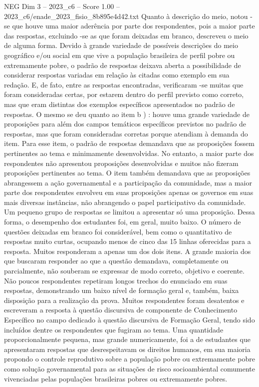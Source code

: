 \begin{textsample}{NEG Dim 3 – 2023\_c6 – Score 1.00 – 2023\_c6/enade\_2023\_fisio\_8b895e4d42.txt}
Quanto à descrição do meio, notou -se que houve uma maior aderência por parte dos respondentes, pois a maior parte das respostas, excluindo -se as que foram deixadas em branco, descreveu o meio de alguma forma.
Devido à grande variedade de possíveis descrições do meio geográfico e/ou social em que vive a população brasileira de perfil pobre ou extremamente pobre, o padrão de respostas deixava aberta a possibilidade de considerar respostas variadas em relação às citadas como exemplo em sua redação.
E, de fato, entre as respostas encontradas, verificaram -se muitas que foram consideradas certas, por estarem dentro do perfil previsto como correto, mas que eram distintas dos exemplos específicos apresentados no padrão de respostas.
O mesmo se deu quanto ao item b ) : houve uma grande variedade de proposições para além dos campos temáticos específicos previstos no padrão de respostas, mas que foram consideradas corretas porque atendiam à demanda do item.
Para esse item, o padrão de respostas demandava que as proposições fossem pertinentes ao tema e minimamente desenvolvidas.
No entanto, a maior parte dos respondentes não apresentou proposições desenvolvidas e muitos não fizeram proposições pertinentes ao tema.
O item também demandava que as proposições abrangessem a ação governamental e a participação da comunidade, mas a maior parte dos respondentes envolveu em suas proposições apenas os governos em suas mais diversas instâncias, não abrangendo o papel participativo da comunidade.
Um pequeno grupo de respostas se limitou a apresentar só uma proposição.
Dessa forma, o desempenho dos estudantes foi, em geral, muito baixo.
O número de questões deixadas em branco foi considerável, bem como o quantitativo de respostas muito curtas, ocupando menos de cinco das 15 linhas oferecidas para a resposta.
Muitos responderam a apenas um dos dois itens.
A grande maioria dos que buscaram responder ao que a questão demandava, completamente ou parcialmente, não souberam se expressar de modo correto, objetivo e coerente.
Não poucos respondentes repetiram longos trechos do enunciado em suas respostas, demonstrando um baixo nível de formação geral e, também, baixa disposição para a realização da prova.
Muitos respondentes foram desatentos e escreveram a resposta à questão discursiva de componente de Conhecimento Específico no campo dedicado à questão discursiva de Formação Geral, tendo sido incluídos dentre os respondentes que fugiram ao tema.
Uma quantidade proporcionalmente pequena, mas grande numericamente, foi a de estudantes que apresentaram respostas que desrespeitavam os direitos humanos, em sua maioria propondo o controle reprodutivo sobre a população pobre ou extremamente pobre como solução governamental para as situações de risco socioambiental comumente vivenciadas pelas populações brasileiras pobres ou extremamente pobres.

\end{textsample}
